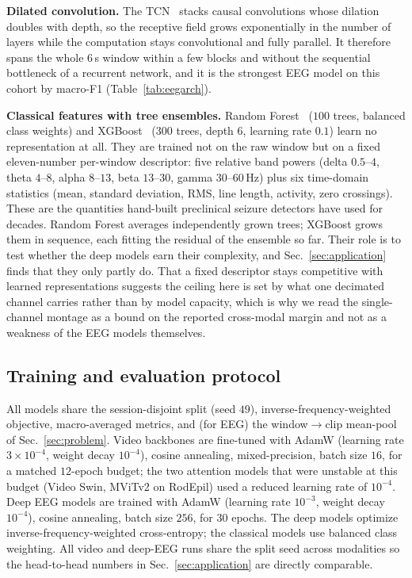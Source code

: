 \noindent\textbf{Dilated convolution.}
The TCN~\cite{bai2018tcn} stacks causal convolutions whose dilation doubles with
depth, so the receptive field grows exponentially in the number of layers while the
computation stays convolutional and fully parallel. It therefore spans the whole
$6$\,s window within a few blocks and without the sequential bottleneck of a
recurrent network, and it is the strongest EEG model on this cohort by macro-F1
(Table~\ref{tab:eegarch}).

\noindent\textbf{Classical features with tree ensembles.}
Random Forest~\cite{breiman2001rf} ($100$ trees, balanced class weights) and
XGBoost~\cite{chen2016xgboost} ($300$ trees, depth $6$, learning rate $0.1$) learn no
representation at all. They are trained not on the raw window but on a fixed
eleven-number per-window descriptor: five relative band powers (delta $0.5$--$4$, theta $4$--$8$, alpha $8$--$13$, beta $13$--$30$, gamma $30$--$60$\,Hz) plus six time-domain statistics (mean, standard deviation, RMS, line length, activity, zero crossings). These are the quantities hand-built preclinical seizure detectors have used for decades. Random Forest averages independently grown trees; XGBoost grows them in
sequence, each fitting the residual of the ensemble so far. Their role is to test
whether the deep models earn their complexity, and Sec.~\ref{sec:application} finds
that they only partly do. That a fixed descriptor stays competitive with learned
representations suggests the ceiling here is set by what one decimated channel
carries rather than by model capacity, which is why we read the single-channel
montage as a bound on the reported cross-modal margin and not as a weakness of
the EEG models themselves.

\subsection{Training and evaluation protocol}
\label{sec:arch:train}
All models share the session-disjoint split (seed $49$), inverse-frequency-weighted
objective, macro-averaged metrics, and (for EEG) the window$\to$clip mean-pool of
Sec.~\ref{sec:problem}. Video backbones are fine-tuned with
AdamW (learning rate $3\times10^{-4}$, weight decay $10^{-4}$), cosine annealing,
mixed-precision, batch size $16$, for a matched $12$-epoch budget; the two
attention models that were unstable at this budget (Video Swin, MViTv2 on RodEpil)
used a reduced learning rate of $10^{-4}$. Deep EEG models are trained with AdamW
(learning rate $10^{-3}$, weight decay $10^{-4}$), cosine annealing, batch size
$256$, for $30$ epochs. The deep models optimize inverse-frequency-weighted
cross-entropy; the classical models use balanced class weighting. All video and
deep-EEG runs share the split seed across modalities so the head-to-head numbers in
Sec.~\ref{sec:application} are directly comparable.


